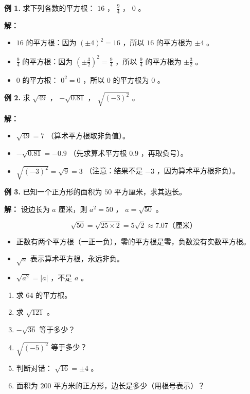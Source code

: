 \begin{workedexamples}


\textbf{例 1.} 求下列各数的平方根： $16$ ， $\frac{9}{4}$ ， $0$ 。

\textbf{解：}

\begin{itemize}
  \item $16$ 的平方根：因为 $(\pm 4)^2 = 16$ ，所以 $16$ 的平方根为 $\pm 4$ 。
  \item $\frac{9}{4}$ 的平方根：因为 $\left(\pm \frac{3}{2}\right)^2 = \frac{9}{4}$ ，所以 $\frac{9}{4}$ 的平方根为 $\pm \frac{3}{2}$ 。
  \item $0$ 的平方根： $0^2 = 0$ ，所以 $0$ 的平方根为 $0$ 。
\end{itemize}


\textbf{例 2.} 求 $\sqrt{49}$ ， $-\sqrt{0.81}$ ， $\sqrt{(-3)^2}$ 。

\textbf{解：}

\begin{itemize}
  \item $\sqrt{49} = 7$ （算术平方根取非负值）。
  \item $-\sqrt{0.81} = -0.9$ （先求算术平方根 $0.9$ ，再取负号）。
  \item $\sqrt{(-3)^2} = \sqrt{9} = 3$ （注意：结果不是 $-3$ ，因为算术平方根非负）。
\end{itemize}


\textbf{例 3.} 已知一个正方形的面积为 $50$ 平方厘米，求其边长。

\textbf{解：} 设边长为 $a$ 厘米，则 $a^2 = 50$ ， $a = \sqrt{50}$ 。

\[
\sqrt{50} = \sqrt{25 \times 2} = 5\sqrt{2} \approx 7.07 \text{（厘米）}
\]


\end{workedexamples}

\begin{keytakeaway}


\begin{itemize}
  \item 正数有两个平方根（一正一负），零的平方根是零，负数没有实数平方根。
  \item $\sqrt{a}$ 表示算术平方根，永远非负。
  \item $\sqrt{a^2} = \lvert a \rvert$ ，不是 $a$ 。
\end{itemize}


\end{keytakeaway}

\begin{practice}


\begin{enumerate}
  \item 求 $64$ 的平方根。
  \item 求 $\sqrt{121}$ 。
  \item $-\sqrt{36}$ 等于多少？
  \item $\sqrt{(-5)^2}$ 等于多少？
  \item 判断对错： $\sqrt{16} = \pm 4$ 。
  \item 面积为 $200$ 平方米的正方形，边长是多少（用根号表示）？
\end{enumerate}


\end{practice}

